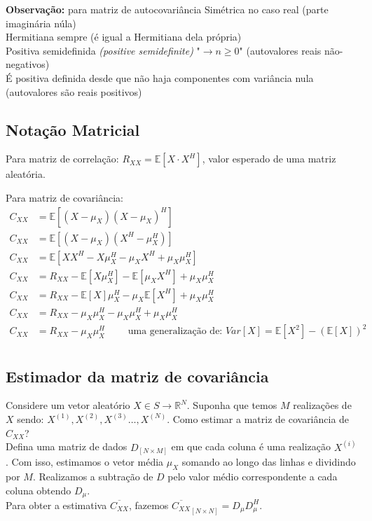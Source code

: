 \documentclass{article}
\renewcommand\bf[1]{\textbf{#1}}
\renewcommand\it[1]{\textit{#1}}
\newcommand\ov[1]{\overline{#1}}
\begin{document}
\vspace{-0.75em}
\bf{Observação:} para matriz de autocovariância
     Simétrica no caso real (parte imaginária núla)
     \\
     Hermitiana sempre (é igual a Hermitiana dela própria)
     \\
     Positiva semidefinida \it{(positive semidefinite)} "$\to n \ge 0$" (autovalores reais
        não-negativos)
        \\
     É positiva definida desde que não haja componentes com variância nula (autovalores são
        reais positivos)

\subsection{Notação Matricial}
Para matriz de correlação: $R_{XX} = \mathbb{E}[X \cdot X^H]$, valor esperado de uma matriz aleatória.

Para matriz de covariância:
\begin{align*}
    C_{XX} &= \mathbb{E}[(X-\mu_X)(X-\mu_X)^H] \\
    C_{XX} &= \mathbb{E}[(X-\mu_X)(X^H-\mu_X^H)] \\
    C_{XX} &= \mathbb{E}[XX^H - X\mu_X^H - \mu_XX^H + \mu_X\mu_X^H] \\
    C_{XX} &= R_{XX} - \mathbb{E}[X\mu_X^H] - \mathbb{E}[\mu_XX^H] + \mu_X\mu_X^H \\
    C_{XX} &= R_{XX} - \mathbb{E}[X]\mu_X^H - \mu_X\mathbb{E}[X^H] + \mu_X\mu_X^H \\
    C_{XX} &= R_{XX} - \mu_X\mu_X^H - \mu_X\mu_X^H + \mu_X\mu_X^H \\
    C_{XX} &= R_{XX} - \mu_X\mu_X^H \qquad \text{ uma generalização de: } Var[X] =
    \mathbb{E}[X^2] - (\mathbb{E}[X])^2 \\[-2.5em]
\end{align*}
\subsection{Estimador da matriz de covariância}
Considere um vetor aleatório $X \in S \to \mathbb{R}^N$. Suponha que temos $M$ realizações de $X$
sendo: $X^{(1)}, X^{(2)}, X^{(3)} \ldots, X^{(N)}$. Como estimar a matriz de covariância de $C_{XX}$?
\\
Defina uma matriz de dados $D_{[N \times M]}$ em que cada coluna é uma realização $X^{(i)}$. Com
isso, estimamos o vetor média $\mu_X$ somando ao longo das linhas e dividindo por $M$. Realizamos
a subtração de $D$ pelo valor médio correspondente a cada coluna obtendo $D_{\mu}$.
\\
Para obter a estimativa $\ov{C_{XX}}$, fazemos $\ov{C_{XX}}_{[N \times N]} = D_{\mu} D_{\mu}^H$.
\end{document}
